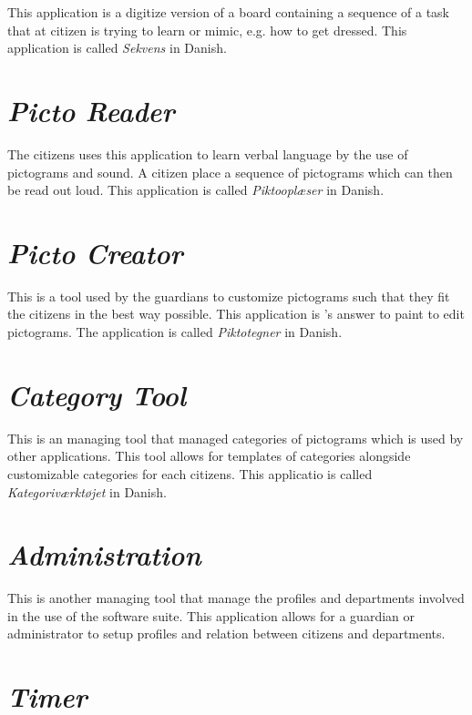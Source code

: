 This application is a digitize version of a board containing a sequence of a task that at citizen is trying to learn or mimic, e.g. how to get dressed. This application is called \emph{Sekvens} in Danish.

\section{\emph{Picto Reader}}
\label{sec:app_picto_reader}

The citizens uses this application to learn verbal language by the use of pictograms and sound. A citizen place a sequence of pictograms which can then be read out loud. This application is called \emph{Piktooplæser} in Danish.

\section{\emph{Picto Creator}}
\label{sec:app_picto_creator}

This is a tool used by the guardians to customize pictograms such that they fit the citizens in the best way possible. This application is \giraf's answer to paint to edit pictograms. The application is called \emph{Piktotegner} in Danish.

\section{\emph{Category Tool}}
\label{sec:app_category_tool}

This is an managing tool that managed categories of pictograms which is used by other applications. This tool allows for templates of categories alongside customizable categories for each citizens. This applicatio is called \emph{Kategoriværktøjet} in Danish.

\section{\emph{Administration}}
\label{sec:app_administration}

This is another managing tool that manage the profiles and departments involved in the use of the \giraf software suite. This application allows for a guardian or administrator to setup profiles and relation between citizens and departments.

\section{\emph{Timer}}
\label{sec:app_timer}

